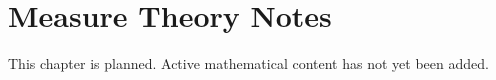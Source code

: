 
\section{Measure Theory Notes}
\begin{remark*}[Status]
This chapter is planned. Active mathematical content has not yet been added.
\end{remark*}

